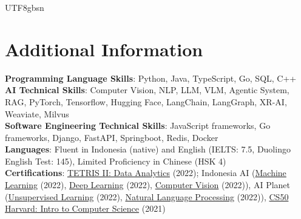 \documentclass[letterpaper,10pt]{article}
\begin{document}
\begin{CJK*}{UTF8}{gbsn}
	\section{Additional Information}
	\begin{itemize}[leftmargin=0.15in, label={}]
		\small{\item{
		      \textbf{Programming Language Skills}{: Python, Java, TypeScript, Go, SQL, C++} \\
		      \textbf{AI Technical Skills}{: Computer Vision, NLP, LLM, VLM, Agentic System, RAG, PyTorch, Tensorflow, Hugging Face, LangChain, LangGraph, XR-AI, Weaviate, Milvus} \\
		      \textbf{Software Engineering Technical Skills}{: JavaScript frameworks, Go frameworks, Django, FastAPI, Springboot, Redis, Docker} \\
		      \textbf{Languages}{: Fluent in Indonesia (native) and English (IELTS: 7.5, Duolingo English Test: 145), Limited Proficiency in Chinese (HSK 4)} \\
		      \textbf{Certifications}{: \href{https://drive.google.com/file/d/1LGxIU7f2DcPAavWGGb3w8n1sH5tmykkq/view?usp=drive_link}{TETRIS II: Data Analytics} (2022); Indonesia AI (\href{https://drive.google.com/file/d/1epVnzJAXUXkG0rDCY730wTkvqDTrKWmm/view?usp=drive_link}{Machine Learning} (2022), \href{https://drive.google.com/file/d/1hHk_ImBLJzZ2NknDrCkT3ZzIs6F4mi3m/view?usp=drive_link}{Deep Learning} (2022), \href{https://drive.google.com/file/d/1C72bTT8PYm3IHrJUUTycmnR05fLWO0an/view?usp=drive_link}{Computer Vision} (2022)), AI Planet (\href{https://drive.google.com/file/d/1ieVkydbAKMGE093SnktFL9BwapL9iu9G/view?usp=drive_link}{Unsupervised Learning} (2022), \href{https://drive.google.com/file/d/1-61Aa_cTMonVNvP91dcCp_PKp65HVTgn/view?usp=drive_link}{Natural Language Processing} (2022)), \href{https://drive.google.com/file/d/1Mjz63QF8Kiiy8I8GsrcZjDwXTZTmdueW/view?usp=drive_link}{CS50 Harvard: Intro to Computer Science} (2021)}
		      }}
	\end{itemize}

\end{CJK*}
\end{document}
